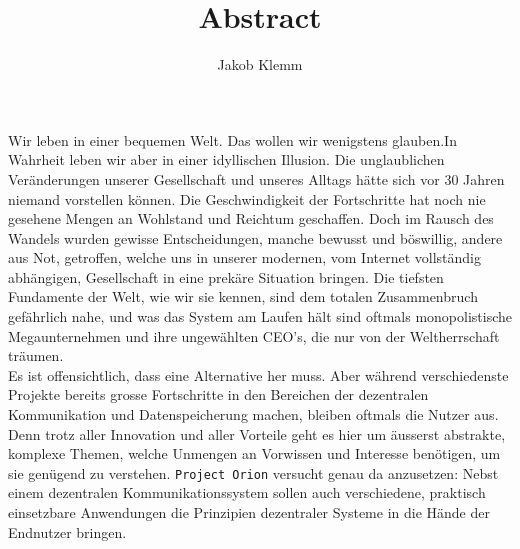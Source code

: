 \documentclass[11pt]{article}
\author{Jakob Klemm}
\date{}
\title{Abstract}
\begin{document}
\noindent Wir leben in einer bequemen Welt. Das wollen wir wenigstens
glauben.In Wahrheit leben wir aber in einer idyllischen Illusion. Die
unglaublichen Veränderungen unserer Gesellschaft und unseres Alltags
hätte sich vor 30 Jahren niemand vorstellen können. Die
Geschwindigkeit der Fortschritte hat noch nie gesehene Mengen an
Wohlstand und Reichtum geschaffen. Doch im Rausch des Wandels wurden
gewisse Entscheidungen, manche bewusst und böswillig, andere aus Not,
getroffen, welche uns in unserer modernen, vom Internet vollständig
abhängigen, Gesellschaft in eine prekäre Situation bringen. Die
tiefsten Fundamente der Welt, wie wir sie kennen, sind dem totalen
Zusammenbruch gefährlich nahe, und was das System am Laufen hält sind
oftmals monopolistische Megaunternehmen und ihre ungewählten CEO's,
die nur von der Weltherrschaft träumen.\\

\noindent Es ist offensichtlich, dass eine Alternative her muss. Aber
während verschiedenste Projekte bereits grosse Fortschritte in den
Bereichen der dezentralen Kommunikation und Datenspeicherung machen,
bleiben oftmals die Nutzer aus. Denn trotz aller Innovation und aller
Vorteile geht es hier um äusserst abstrakte, komplexe Themen, welche
Unmengen an Vorwissen und Interesse benötigen, um sie genügend zu
verstehen. \texttt{Project Orion} versucht genau da anzusetzen: Nebst einem
dezentralen Kommunikationssystem sollen auch verschiedene, praktisch
einsetzbare Anwendungen die Prinzipien dezentraler Systeme in die
Hände der Endnutzer bringen.
\end{document}
